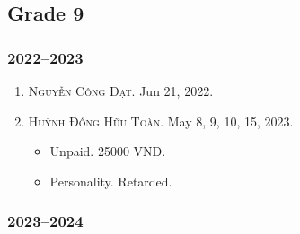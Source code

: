 \documentclass{article}
\begin{document}
\subsection{Grade 9}

\subsubsection{2022--2023}

\begin{enumerate}
	\item \textsc{Nguyễn Công Đạt.} {\sf[In]} Jun 21, 2022. {\sf[Out]}
	\item \textsc{Huỳnh Đồng Hữu Toàn.} {\sf[In]} May 8, 9, 10, 15, 2023. {\sf[Out]}
	\begin{itemize}
		\item {\sf Unpaid.} 25000 VND.
		\item {\sf Personality.} Retarded.
	\end{itemize}
\end{enumerate}

\subsubsection{2023--2024}
\end{document}
